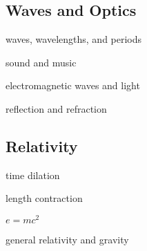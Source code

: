 \documentclass{article}
\begin{document}
\subsection{Waves and Optics}
\begin{itemize*}
  \item waves, wavelengths, and periods
  \item sound and music
  \item electromagnetic waves and light
  \item reflection and refraction
\end{itemize*}

\subsection{Relativity}
\begin{itemize*}
  \item time dilation
  \item length contraction
  \item $e=mc^2$
  \item general relativity and gravity
\end{itemize*}
\end{document}
